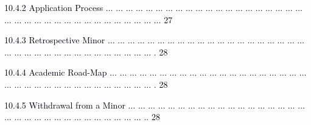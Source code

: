 \documentclass[12pt]{article}
\begin{document}
\vspace{\baselineskip}
\begin{adjustwidth}{0.5in}{0.0in}
{\fontsize{7pt}{8.4pt}\selectfont \textcolor[HTML]{00000A}{10.4.2 Application Process $ \ldots $ $ \ldots $ $ \ldots $ $ \ldots $ $ \ldots $ $ \ldots $ $ \ldots $ $ \ldots $ $ \ldots $ $ \ldots $ $ \ldots $ $ \ldots $ $ \ldots $ $ \ldots $ $ \ldots $ $ \ldots $ $ \ldots $ $ \ldots $ $ \ldots $ $ \ldots $ $ \ldots $ $ \ldots $ $ \ldots $ $ \ldots $ $ \ldots $ $ \ldots $ $ \ldots $ $ \ldots $ $ \ldots $ $ \ldots $ $ \ldots $ $ \ldots $ $ \ldots $ $ \ldots $ $ \ldots $ $ \ldots $  27}\par}\par

\end{adjustwidth}


\vspace{\baselineskip}
\begin{adjustwidth}{0.5in}{0.0in}
{\fontsize{7pt}{8.4pt}\selectfont \textcolor[HTML]{00000A}{10.4.3 Retrospective Minor $ \ldots $ $ \ldots $ $ \ldots $ $ \ldots $ $ \ldots $ $ \ldots $ $ \ldots $ $ \ldots $ $ \ldots $ $ \ldots $ $ \ldots $ $ \ldots $ $ \ldots $ $ \ldots $ $ \ldots $ $ \ldots $ $ \ldots $ $ \ldots $ $ \ldots $ $ \ldots $ $ \ldots $ $ \ldots $ $ \ldots $ $ \ldots $ $ \ldots $ $ \ldots $ $ \ldots $ $ \ldots $ $ \ldots $ $ \ldots $ $ \ldots $ $ \ldots $ $ \ldots $ $ \ldots $ $ \ldots $ . 28}\par}\par

\end{adjustwidth}


\vspace{\baselineskip}
\begin{adjustwidth}{0.5in}{0.0in}
{\fontsize{7pt}{8.4pt}\selectfont \textcolor[HTML]{00000A}{10.4.4 Academic Road-Map $ \ldots $ $ \ldots $ $ \ldots $ $ \ldots $ $ \ldots $ $ \ldots $ $ \ldots $ $ \ldots $ $ \ldots $ $ \ldots $ $ \ldots $ $ \ldots $ $ \ldots $ $ \ldots $ $ \ldots $ $ \ldots $ $ \ldots $ $ \ldots $ $ \ldots $ $ \ldots $ $ \ldots $ $ \ldots $ $ \ldots $ $ \ldots $ $ \ldots $ $ \ldots $ $ \ldots $ $ \ldots $ $ \ldots $ $ \ldots $ $ \ldots $ $ \ldots $ $ \ldots $ $ \ldots $ $ \ldots $ . 28}\par}\par

\end{adjustwidth}


\vspace{\baselineskip}
\begin{adjustwidth}{0.5in}{0.0in}
{\fontsize{7pt}{8.4pt}\selectfont \textcolor[HTML]{00000A}{10.4.5 Withdrawal from a Minor $ \ldots $ $ \ldots $ $ \ldots $ $ \ldots $ $ \ldots $ $ \ldots $ $ \ldots $ $ \ldots $ $ \ldots $ $ \ldots $ $ \ldots $ $ \ldots $ $ \ldots $ $ \ldots $ $ \ldots $ $ \ldots $ $ \ldots $ $ \ldots $ $ \ldots $ $ \ldots $ $ \ldots $ $ \ldots $ $ \ldots $ $ \ldots $ $ \ldots $ $ \ldots $ $ \ldots $ $ \ldots $ $ \ldots $ $ \ldots $ $ \ldots $ $ \ldots $ .. 28}\par}\par

\end{adjustwidth}
\end{document}
